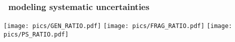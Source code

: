 
\begin{frame}\frametitle{\ttbar\ modeling systematic uncertainties}
\centering\footnotesize

\texttt{[image: pics/GEN\_RATIO.pdf]}
\texttt{[image: pics/FRAG\_RATIO.pdf]}
\texttt{[image: pics/PS\_RATIO.pdf]}

\end{frame}

